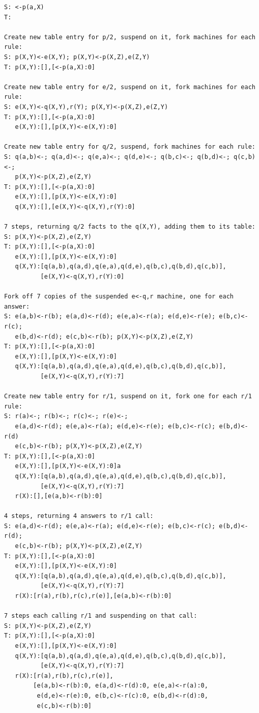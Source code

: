 \footnotesize
\begin{verbatim}
S: <-p(a,X)
T:

Create new table entry for p/2, suspend on it, fork machines for each rule:
S: p(X,Y)<-e(X,Y); p(X,Y)<-p(X,Z),e(Z,Y)
T: p(X,Y):[],[<-p(a,X):0]

Create new table entry for e/2, suspend on it, fork machines for each rule:
S: e(X,Y)<-q(X,Y),r(Y); p(X,Y)<-p(X,Z),e(Z,Y)
T: p(X,Y):[],[<-p(a,X):0]
   e(X,Y):[],[p(X,Y)<-e(X,Y):0]

Create new table entry for q/2, suspend, fork machines for each rule:
S: q(a,b)<-; q(a,d)<-; q(e,a)<-; q(d,e)<-; q(b,c)<-; q(b,d)<-; q(c,b)<-;
   p(X,Y)<-p(X,Z),e(Z,Y)
T: p(X,Y):[],[<-p(a,X):0]
   e(X,Y):[],[p(X,Y)<-e(X,Y):0]
   q(X,Y):[],[e(X,Y)<-q(X,Y),r(Y):0]

7 steps, returning q/2 facts to the q(X,Y), adding them to its table:
S: p(X,Y)<-p(X,Z),e(Z,Y)
T: p(X,Y):[],[<-p(a,X):0]
   e(X,Y):[],[p(X,Y)<-e(X,Y):0]
   q(X,Y):[q(a,b),q(a,d),q(e,a),q(d,e),q(b,c),q(b,d),q(c,b)],
          [e(X,Y)<-q(X,Y),r(Y):0]

Fork off 7 copies of the suspended e<-q,r machine, one for each answer:
S: e(a,b)<-r(b); e(a,d)<-r(d); e(e,a)<-r(a); e(d,e)<-r(e); e(b,c)<-r(c);
   e(b,d)<-r(d); e(c,b)<-r(b); p(X,Y)<-p(X,Z),e(Z,Y)
T: p(X,Y):[],[<-p(a,X):0]
   e(X,Y):[],[p(X,Y)<-e(X,Y):0]
   q(X,Y):[q(a,b),q(a,d),q(e,a),q(d,e),q(b,c),q(b,d),q(c,b)],
          [e(X,Y)<-q(X,Y),r(Y):7]

Create new table entry for r/1, suspend on it, fork one for each r/1 rule:
S: r(a)<-; r(b)<-; r(c)<-; r(e)<-;
   e(a,d)<-r(d); e(e,a)<-r(a); e(d,e)<-r(e); e(b,c)<-r(c); e(b,d)<-r(d)
   e(c,b)<-r(b); p(X,Y)<-p(X,Z),e(Z,Y)
T: p(X,Y):[],[<-p(a,X):0]
   e(X,Y):[],[p(X,Y)<-e(X,Y):0]a
   q(X,Y):[q(a,b),q(a,d),q(e,a),q(d,e),q(b,c),q(b,d),q(c,b)],
          [e(X,Y)<-q(X,Y),r(Y):7]
   r(X):[],[e(a,b)<-r(b):0]

4 steps, returning 4 answers to r/1 call:
S: e(a,d)<-r(d); e(e,a)<-r(a); e(d,e)<-r(e); e(b,c)<-r(c); e(b,d)<-r(d);
   e(c,b)<-r(b); p(X,Y)<-p(X,Z),e(Z,Y)
T: p(X,Y):[],[<-p(a,X):0]
   e(X,Y):[],[p(X,Y)<-e(X,Y):0]
   q(X,Y):[q(a,b),q(a,d),q(e,a),q(d,e),q(b,c),q(b,d),q(c,b)],
          [e(X,Y)<-q(X,Y),r(Y):7]
   r(X):[r(a),r(b),r(c),r(e)],[e(a,b)<-r(b):0]

7 steps each calling r/1 and suspending on that call:
S: p(X,Y)<-p(X,Z),e(Z,Y)
T: p(X,Y):[],[<-p(a,X):0]
   e(X,Y):[],[p(X,Y)<-e(X,Y):0]
   q(X,Y):[q(a,b),q(a,d),q(e,a),q(d,e),q(b,c),q(b,d),q(c,b)],
          [e(X,Y)<-q(X,Y),r(Y):7]
   r(X):[r(a),r(b),r(c),r(e)],
        [e(a,b)<-r(b):0, e(a,d)<-r(d):0, e(e,a)<-r(a):0,
         e(d,e)<-r(e):0, e(b,c)<-r(c):0, e(b,d)<-r(d):0,
         e(c,b)<-r(b):0]


\end{verbatim}
